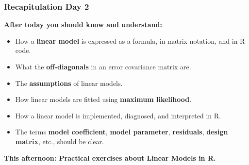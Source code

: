 \documentclass{beamer}
\begin{document}
\begin{frame}
\begin{columns}
\begin{column}{0.5\textwidth}
            \scalebox{0.75}{
                
            }
        \end{column}
    \end{columns}
    
\end{frame}

\begin{frame}
    \frametitle{Recapitulation Day 2}
    \textbf{After today you should know and understand:}
    \begin{itemize}
        \item How a \textbf{linear model} is expressed as a formula, in matrix notation, and in R code.
        \item What the \textbf{off-diagonals} in an error covariance matrix are.
        \item The \textbf{assumptions} of linear models.
        \item How linear models are fitted using \textbf{maximum likelihood}.
        \item How a linear model is implemented, diagnosed, and interpreted in R.
        \item The terms \textbf{model coefficient}, \textbf{model parameter}, \textbf{residuals}, \textbf{design matrix}, etc., should be clear.
    \end{itemize}
    \vspace{1cm}
    \textbf{This afternoon: Practical exercises about Linear Models in R.}
\end{frame}
\end{document}

